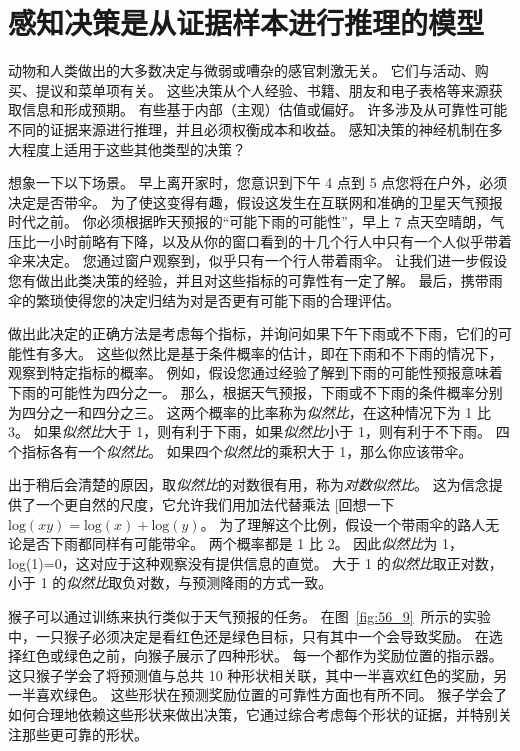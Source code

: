 \section{感知决策是从证据样本进行推理的模型}

动物和人类做出的大多数决定与微弱或嘈杂的感官刺激无关。
它们与活动、购买、提议和菜单项有关。
这些决策从个人经验、书籍、朋友和电子表格等来源获取信息和形成预期。
有些基于内部（主观）估值或偏好。
许多涉及从可靠性可能不同的证据来源进行推理，并且必须权衡成本和收益。
感知决策的神经机制在多大程度上适用于这些其他类型的决策？


想象一下以下场景。
早上离开家时，您意识到下午 4 点到 5 点您将在户外，必须决定是否带伞。
为了使这变得有趣，假设这发生在互联网和准确的卫星天气预报时代之前。
你必须根据昨天预报的“可能下雨的可能性”，早上 7 点天空晴朗，气压比一小时前略有下降，以及从你的窗口看到的十几个行人中只有一个人似乎带着伞来决定。
您通过窗户观察到，似乎只有一个行人带着雨伞。
让我们进一步假设您有做出此类决策的经验，并且对这些指标的可靠性有一定了解。
最后，携带雨伞的繁琐使得您的决定归结为对是否更有可能下雨的合理评估。


做出此决定的正确方法是考虑每个指标，并询问如果下午下雨或不下雨，它们的可能性有多大。
这些似然比是基于条件概率的估计，即在下雨和不下雨的情况下，观察到特定指标的概率。
例如，假设您通过经验了解到下雨的可能性预报意味着下雨的可能性为四分之一。
那么，根据天气预报，下雨或不下雨的条件概率分别为四分之一和四分之三。
这两个概率的比率称为\textit{似然比}，在这种情况下为 1 比 3。
如果\textit{似然比}大于 1，则有利于下雨，如果\textit{似然比}小于 1，则有利于不下雨。
四个指标各有一个\textit{似然比}。
如果四个\textit{似然比}的乘积大于 1，那么你应该带伞。


出于稍后会清楚的原因，取\textit{似然比}的对数很有用，称为\textit{对数似然比}。
这为信念提供了一个更自然的尺度，它允许我们用加法代替乘法 [回想一下$\text{log}(xy) = \text{log}(x) + \text{log}(y) $。
为了理解这个比例，假设一个带雨伞的路人无论是否下雨都同样有可能带伞。
两个概率都是 1 比 2。
因此\textit{似然比}为 1，log(1)=0，这对应于这种观察没有提供信息的直觉。
大于 1 的\textit{似然比}取正对数，小于 1 的\textit{似然比}取负对数，与预测降雨的方式一致。


猴子可以通过训练来执行类似于天气预报的任务。
在图~\ref{fig:56_9}~所示的实验中，一只猴子必须决定是看红色还是绿色目标，只有其中一个会导致奖励。
在选择红色或绿色之前，向猴子展示了四种形状。
每一个都作为奖励位置的指示器。
这只猴子学会了将预测值与总共 10 种形状相关联，其中一半喜欢红色的奖励，另一半喜欢绿色。
这些形状在预测奖励位置的可靠性方面也有所不同。
猴子学会了如何合理地依赖这些形状来做出决策，它通过综合考虑每个形状的证据，并特别关注那些更可靠的形状。


